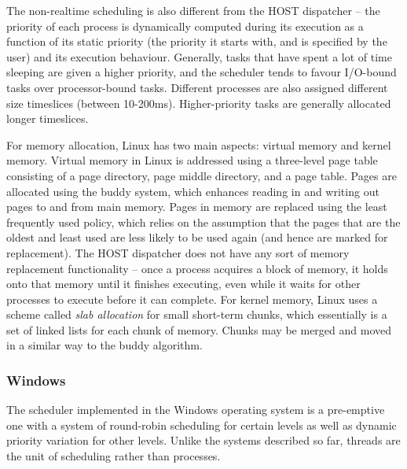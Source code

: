 \documentclass[12pt]{article}
\begin{document}
The non-realtime scheduling is also different from the HOST dispatcher --
the priority of each process is dynamically computed during its execution as
a function of its static priority (the priority it starts with, and is 
specified by the user) and its execution behaviour. Generally, tasks that have
spent a lot of time sleeping are given a higher priority, and the scheduler
tends to favour I/O-bound tasks over processor-bound tasks. Different processes
are also assigned different size timeslices (between 10-200ms). Higher-priority
tasks are generally allocated longer timeslices.

For memory allocation, Linux has two main aspects: virtual memory and kernel
memory. Virtual memory in Linux is addressed using a three-level page table
consisting of a page directory, page middle directory, and a page table. Pages
are allocated using the buddy system, which enhances reading in and writing out
pages to and from main memory. Pages in memory are replaced using the least
frequently used policy, which relies on the assumption that the pages that are
the oldest and least used are less likely to be used again (and hence are
marked for replacement). The HOST dispatcher does not have any sort of
memory replacement functionality -- once a process acquires a block of memory,
it holds onto that memory until it finishes executing, even while it waits for
other processes to execute before it can complete. For kernel memory, Linux
uses a scheme called \textit{slab allocation} for small short-term chunks,
which essentially is a set of linked lists for each chunk of memory. Chunks may
be merged and moved in a similar way to the buddy algorithm.

\subsubsection{Windows}
The scheduler implemented in the Windows operating system is a pre-emptive one
with a system of round-robin scheduling for certain levels as well as dynamic
priority variation for other levels. Unlike the systems described so far,
threads are the unit of scheduling rather than processes. 
\end{document}
